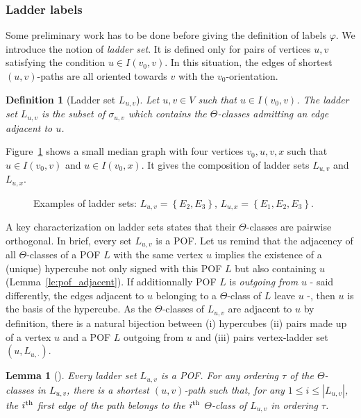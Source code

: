 \documentclass{article}
\newtheorem{definition}{Definition}
\newtheorem{lemma}{Lemma}
\newcommand{\set}[1]{\left\{ #1 \right\}}
\newcommand{\card}[1]{\left| #1 \right|}
\newcommand{\ith}[1]{#1^{\mbox{\scriptsize{th}}}}
\begin{document}
\subsubsection{Ladder labels} \label{subsubsec:ladder}

Some preliminary work has to be done before giving the definition of labels $\varphi$. We introduce the notion of \textit{ladder set}. It is defined only for pairs of vertices $u,v$ satisfying the condition $u \in I(v_0,v)$. In this situation, the edges of shortest $(u,v)$-paths are all oriented towards $v$ with the $v_0$-orientation.

\begin{definition}[Ladder set $L_{u,v}$]
Let $u,v \in V$ such that $u \in I(v_0,v)$. The ladder set $L_{u,v}$ is the subset of $\sigma_{u,v}$ which contains the $\Theta$-classes admitting an edge adjacent to $u$.
\label{def:ladder}
\end{definition}

Figure~\ref{fig:compute_labels} shows a small median graph with four vertices $v_0,u,v,x$ such that $u \in I(v_0,v)$ and $u \in I(v_0,x)$. It gives the composition of ladder sets $L_{u,v}$ and $L_{u,x}$.

\begin{figure}[h]
\centering
\scalebox{0.8}{}
\caption{Examples of ladder sets: $L_{u,v} = \set{E_2,E_3}$, $L_{u,x} = \set{E_1,E_2,E_3}$.}
\label{fig:compute_labels}
\end{figure}

A key characterization on ladder sets states that their $\Theta$-classes are pairwise orthogonal. In brief, every set $L_{u,v}$ is a POF. Let us remind that the adjacency of all $\Theta$-classes of a POF $L$ with the same vertex $u$ implies the existence of a (unique) hypercube not only signed with this POF $L$ but also containing $u$ (Lemma~\ref{le:pof_adjacent}). If additionnally POF $L$ is \textit{outgoing from} $u$ - said differently, the edges adjacent to $u$ belonging to a $\Theta$-class of $L$ leave $u$ -, then $u$ is the basis of the hypercube.  As the $\Theta$-classes of $L_{u,v}$ are adjacent to $u$ by definition, there is a natural bijection between (i) hypercubes (ii) pairs made up of a vertex $u$ and a POF $L$ outgoing from $u$ and (iii) pairs vertex-ladder set $(u,L_{u,\cdot})$.

\begin{lemma}[\cite{BeHa21}]
Every ladder set $L_{u,v}$ is a POF. For any ordering $\tau$ of the $\Theta$-classes in $L_{u,v}$, there is a shortest $(u,v)$-path such that, for any $1\le i \le \card{L_{u,v}}$, the $\ith{i}$ first edge of the path belongs to the $\ith{i}$ $\Theta$-class of $L_{u,v}$ in ordering $\tau$.
\label{le:ladder_POF}
\end{lemma}
\end{document}
